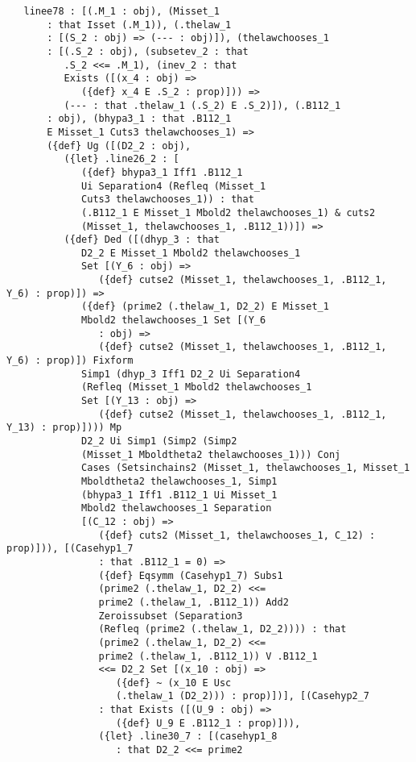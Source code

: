 \documentclass[12pt]{article}
\begin{document}
\begin{verbatim}
   linee78 : [(.M_1 : obj), (Misset_1 
       : that Isset (.M_1)), (.thelaw_1 
       : [(S_2 : obj) => (--- : obj)]), (thelawchooses_1 
       : [(.S_2 : obj), (subsetev_2 : that 
          .S_2 <<= .M_1), (inev_2 : that 
          Exists ([(x_4 : obj) => 
             ({def} x_4 E .S_2 : prop)])) => 
          (--- : that .thelaw_1 (.S_2) E .S_2)]), (.B112_1 
       : obj), (bhypa3_1 : that .B112_1 
       E Misset_1 Cuts3 thelawchooses_1) => 
       ({def} Ug ([(D2_2 : obj), 
          ({let} .line26_2 : [
             ({def} bhypa3_1 Iff1 .B112_1 
             Ui Separation4 (Refleq (Misset_1 
             Cuts3 thelawchooses_1)) : that 
             (.B112_1 E Misset_1 Mbold2 thelawchooses_1) & cuts2 
             (Misset_1, thelawchooses_1, .B112_1))]) => 
          ({def} Ded ([(dhyp_3 : that 
             D2_2 E Misset_1 Mbold2 thelawchooses_1 
             Set [(Y_6 : obj) => 
                ({def} cutse2 (Misset_1, thelawchooses_1, .B112_1, Y_6) : prop)]) => 
             ({def} (prime2 (.thelaw_1, D2_2) E Misset_1 
             Mbold2 thelawchooses_1 Set [(Y_6 
                : obj) => 
                ({def} cutse2 (Misset_1, thelawchooses_1, .B112_1, Y_6) : prop)]) Fixform 
             Simp1 (dhyp_3 Iff1 D2_2 Ui Separation4 
             (Refleq (Misset_1 Mbold2 thelawchooses_1 
             Set [(Y_13 : obj) => 
                ({def} cutse2 (Misset_1, thelawchooses_1, .B112_1, Y_13) : prop)]))) Mp 
             D2_2 Ui Simp1 (Simp2 (Simp2 
             (Misset_1 Mboldtheta2 thelawchooses_1))) Conj 
             Cases (Setsinchains2 (Misset_1, thelawchooses_1, Misset_1 
             Mboldtheta2 thelawchooses_1, Simp1 
             (bhypa3_1 Iff1 .B112_1 Ui Misset_1 
             Mbold2 thelawchooses_1 Separation 
             [(C_12 : obj) => 
                ({def} cuts2 (Misset_1, thelawchooses_1, C_12) : prop)])), [(Casehyp1_7 
                : that .B112_1 = 0) => 
                ({def} Eqsymm (Casehyp1_7) Subs1 
                (prime2 (.thelaw_1, D2_2) <<= 
                prime2 (.thelaw_1, .B112_1)) Add2 
                Zeroissubset (Separation3 
                (Refleq (prime2 (.thelaw_1, D2_2)))) : that 
                (prime2 (.thelaw_1, D2_2) <<= 
                prime2 (.thelaw_1, .B112_1)) V .B112_1 
                <<= D2_2 Set [(x_10 : obj) => 
                   ({def} ~ (x_10 E Usc 
                   (.thelaw_1 (D2_2))) : prop)])], [(Casehyp2_7 
                : that Exists ([(U_9 : obj) => 
                   ({def} U_9 E .B112_1 : prop)])), 
                ({let} .line30_7 : [(casehyp1_8 
                   : that D2_2 <<= prime2 

\end{verbatim}
\end{document}
